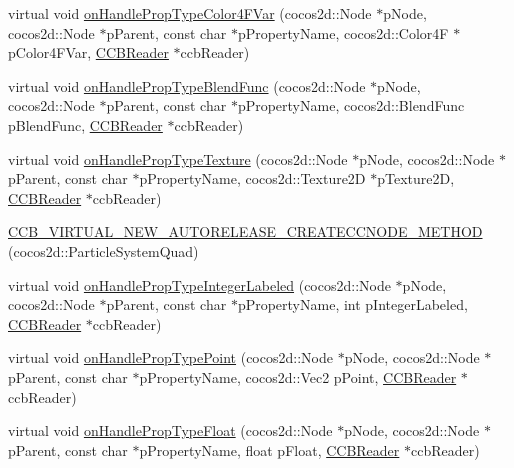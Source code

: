 \begin{DoxyCompactItemize}
virtual void \hyperlink{classcocosbuilder_1_1ParticleSystemQuadLoader_ab31492ee9f4834fd84213d39cfa5a538}{on\+Handle\+Prop\+Type\+Color4\+F\+Var} (cocos2d\+::\+Node $\ast$p\+Node, cocos2d\+::\+Node $\ast$p\+Parent, const char $\ast$p\+Property\+Name, cocos2d\+::\+Color4F $\ast$p\+Color4\+F\+Var, \hyperlink{classcocosbuilder_1_1CCBReader}{C\+C\+B\+Reader} $\ast$ccb\+Reader)
\item 
virtual void \hyperlink{classcocosbuilder_1_1ParticleSystemQuadLoader_a9beea0b8c5da3ce78cbc214759273ddc}{on\+Handle\+Prop\+Type\+Blend\+Func} (cocos2d\+::\+Node $\ast$p\+Node, cocos2d\+::\+Node $\ast$p\+Parent, const char $\ast$p\+Property\+Name, cocos2d\+::\+Blend\+Func p\+Blend\+Func, \hyperlink{classcocosbuilder_1_1CCBReader}{C\+C\+B\+Reader} $\ast$ccb\+Reader)
\item 
virtual void \hyperlink{classcocosbuilder_1_1ParticleSystemQuadLoader_a772ee73c21507af525fa3464dd99f44a}{on\+Handle\+Prop\+Type\+Texture} (cocos2d\+::\+Node $\ast$p\+Node, cocos2d\+::\+Node $\ast$p\+Parent, const char $\ast$p\+Property\+Name, cocos2d\+::\+Texture2D $\ast$p\+Texture2D, \hyperlink{classcocosbuilder_1_1CCBReader}{C\+C\+B\+Reader} $\ast$ccb\+Reader)
\item 
\hyperlink{classcocosbuilder_1_1ParticleSystemQuadLoader_a6b73cbf9bdc20a14180835461c7916d7}{C\+C\+B\+\_\+\+V\+I\+R\+T\+U\+A\+L\+\_\+\+N\+E\+W\+\_\+\+A\+U\+T\+O\+R\+E\+L\+E\+A\+S\+E\+\_\+\+C\+R\+E\+A\+T\+E\+C\+C\+N\+O\+D\+E\+\_\+\+M\+E\+T\+H\+OD} (cocos2d\+::\+Particle\+System\+Quad)
\item 
virtual void \hyperlink{classcocosbuilder_1_1ParticleSystemQuadLoader_a0f1c7659a896babec4503ef1a25b67d2}{on\+Handle\+Prop\+Type\+Integer\+Labeled} (cocos2d\+::\+Node $\ast$p\+Node, cocos2d\+::\+Node $\ast$p\+Parent, const char $\ast$p\+Property\+Name, int p\+Integer\+Labeled, \hyperlink{classcocosbuilder_1_1CCBReader}{C\+C\+B\+Reader} $\ast$ccb\+Reader)
\item 
virtual void \hyperlink{classcocosbuilder_1_1ParticleSystemQuadLoader_a4889d27aac2073ebee6c9648fbf59c1f}{on\+Handle\+Prop\+Type\+Point} (cocos2d\+::\+Node $\ast$p\+Node, cocos2d\+::\+Node $\ast$p\+Parent, const char $\ast$p\+Property\+Name, cocos2d\+::\+Vec2 p\+Point, \hyperlink{classcocosbuilder_1_1CCBReader}{C\+C\+B\+Reader} $\ast$ccb\+Reader)
\item 
virtual void \hyperlink{classcocosbuilder_1_1ParticleSystemQuadLoader_ab97d81fc96cd18ba00decea0efd753b6}{on\+Handle\+Prop\+Type\+Float} (cocos2d\+::\+Node $\ast$p\+Node, cocos2d\+::\+Node $\ast$p\+Parent, const char $\ast$p\+Property\+Name, float p\+Float, \hyperlink{classcocosbuilder_1_1CCBReader}{C\+C\+B\+Reader} $\ast$ccb\+Reader)

\end{DoxyCompactItemize}
